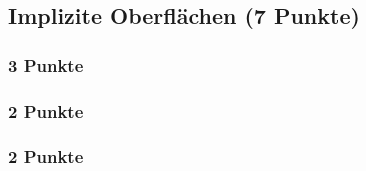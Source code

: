 \newif\ifvimbug
\vimbugfalse

\ifvimbug

\fi


\subsection{Implizite Oberflächen (7 Punkte)}
\subsubsection{3 Punkte}

\subsubsection{2 Punkte}

\subsubsection{2 Punkte}